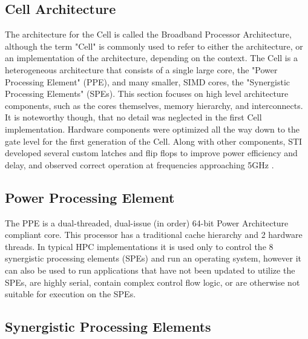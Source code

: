 \documentclass{sig-alternate-05-2015}
\begin{document}
\subsection{Cell Architecture}
The architecture for the Cell is called the Broadband Processor Architecture, although the term "Cell" is commonly used to refer to either the architecture, or an implementation of the architecture, depending on the context. The Cell is a heterogeneous architecture that consists of a single large core, the "Power Processing Element" (PPE), and many smaller, SIMD cores, the "Synergistic Processing Elements" (SPEs). This section focuses on high level architecture components, such as the cores themselves, memory hierarchy, and interconnects. It is noteworthy though, that no detail was neglected in the first Cell implementation. Hardware components were optimized all the way down to the gate level for the first generation of the Cell. Along with other components, STI developed several custom latches and flip flops to improve power efficiency and delay, and observed correct operation at frequencies approaching 5GHz \cite{pham2005design}.

\subsection{Power Processing Element}

The PPE is a dual-threaded, dual-issue (in order) 64-bit Power Architecture compliant core. This processor has a traditional cache hierarchy and 2 hardware threads. In typical HPC implementations it is used only to control the 8 synergistic processing elements (SPEs) and run an operating system, however it can also be used to run applications that have not been updated to utilize the SPEs, are highly serial, contain complex control flow logic, or are otherwise not suitable for execution on the SPEs.

\subsection{Synergistic Processing Elements}
\end{document}
